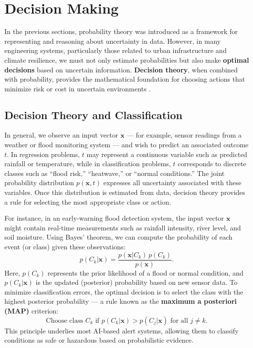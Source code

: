 \documentclass[12pt]{article}
\begin{document}
\section{Decision Making}

In the previous sections, probability theory was introduced as a framework for representing and reasoning about uncertainty in data. 
However, in many engineering systems, particularly those related to urban infrastructure and climate resilience, we must not only estimate probabilities but also make \textbf{optimal decisions} based on uncertain information. 
\textbf{Decision theory}, when combined with probability, provides the mathematical foundation for choosing actions that minimize risk or cost in uncertain environments \cite{bishop2006pattern}.

\subsection{Decision Theory and Classification}

In general, we observe an input vector \( \mathbf{x} \) — for example, sensor readings from a weather or flood monitoring system — 
and wish to predict an associated outcome \( t \). 
In regression problems, \( t \) may represent a continuous variable such as predicted rainfall or temperature, while in classification 
problems, \( t \) corresponds to discrete classes such as “flood risk,” “heatwave,” or “normal conditions.” 
The joint probability distribution \( p(\mathbf{x}, t) \) expresses all uncertainty associated with these variables. 
Once this distribution is estimated from data, decision theory provides a rule for selecting the most appropriate class or action.

For instance, in an early-warning flood detection system, the input vector \( \mathbf{x} \) might contain real-time measurements 
such as rainfall intensity, river level, and soil moisture. 
Using Bayes’ theorem, we can compute the probability of each event (or class) given these observations:
\[
p(C_k | \mathbf{x}) = \frac{p(\mathbf{x} | C_k)\, p(C_k)}{p(\mathbf{x})}.
\]
Here, \( p(C_k) \) represents the prior likelihood of a flood or normal condition, and \( p(C_k | \mathbf{x}) \) is the updated (posterior) probability based on new sensor data. 
To minimize classification errors, the optimal decision is to select the class with the highest posterior probability — 
a rule known as the \textbf{maximum a posteriori (MAP)} criterion:
\[
\text{Choose class } C_k \text{ if } p(C_k | \mathbf{x}) > p(C_j | \mathbf{x}) \text{ for all } j \neq k.
\]
This principle underlies most AI-based alert systems, allowing them to classify conditions as safe or hazardous based on 
probabilistic evidence.
\end{document}
